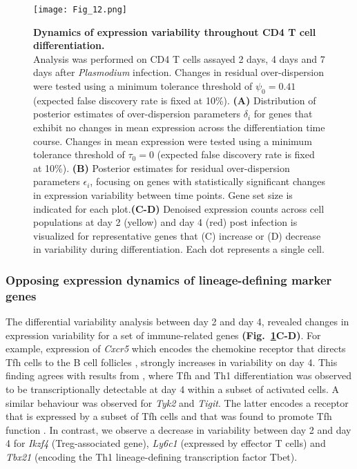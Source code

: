 \begin{figure}[!h]
\centering
\texttt{[image: Fig\_12.png]}
\caption[Dynamics of expression variability throughout CD4\plus{} T cell differentiation]{\textbf{Dynamics of expression variability throughout CD4\plus{} T cell differentiation.}\\
Analysis was performed on CD4\plus{} T cells assayed 2 days, 4 days and 7 days after \textit{Plasmodium} infection. Changes in residual over-dispersion were tested using a minimum tolerance threshold of $\psi_0=0.41$ (expected false discovery rate is fixed at 10\%). \textbf{(A)} Distribution of posterior estimates of over-dispersion parameters $\delta_i$ for genes that exhibit no changes in mean expression across the differentiation time course. Changes in mean expression were tested using a minimum tolerance threshold of $\tau_0=0$ (expected false discovery rate is fixed at 10\%). \textbf{(B)} Posterior estimates for residual over-dispersion parameters  $\epsilon_i$, focusing on genes with statistically significant changes in expression variability between time points. Gene set size is indicated for each plot.\textbf{(C-D)} Denoised expression counts across cell populations at day 2 (yellow) and day 4 (red) post infection is visualized for representative genes that (C) increase or (D) decrease in variability during differentiation. Each dot represents a single cell.\\}
\label{fig2:immune_differentiation}
\end{figure}

\newpage

\subsubsection{Opposing expression dynamics of lineage-defining marker genes}

The differential variability analysis between day 2 and day 4, revealed  changes in expression variability for a set of immune-related genes \textbf{(Fig.~\ref{fig2:immune_differentiation}C-D)}. For example, expression of \textit{Cxcr5} which encodes the chemokine receptor that directs Tfh cells to the B cell follicles \citep{Crotty2014}, strongly increases in variability on day 4. This finding agrees with results from \cite{Lonnberg2017}, where Tfh and Th1 differentiation was observed to be transcriptionally detectable at day 4 within a subset of activated cells. A similar behaviour was observed for \textit{Tyk2} and \textit{Tigit}. The latter encodes a receptor that is expressed by a subset of Tfh cells and that was found to promote Tfh function \citep{Godefroy2015}. In contrast, we observe a decrease in variability between day 2 and day 4 for \textit{Ikzf4} (Treg-associated gene), \textit{Ly6c1} (expressed by effector T cells) and \textit{Tbx21} (encoding the Th1 lineage-defining transcription factor Tbet). \\

